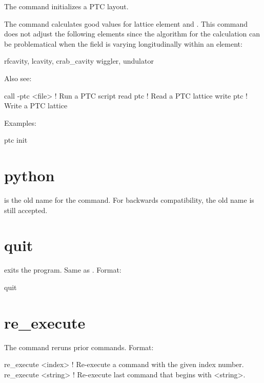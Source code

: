 \vskip 10pt 

The  command initializes a PTC layout.

The  command calculates good values for lattice element  and . This
command does not adjust the following elements since the algorithm for the calculation can be problematical when the field
is varying longitudinally within an element:
\begin{example}
  rfcavity, lcavity, crab_cavity
  wiggler, undulator
\end{example}

Also see:
\begin{example}
  call -ptc <file>         ! Run a PTC script
  read ptc                 ! Read a PTC lattice
  write ptc                ! Write a PTC lattice
\end{example}

Examples:
\begin{example}
  ptc init
\end{example}


\section{python}
\label{s:python}

 is the old name for the  command. For backwards compatibility,
the old name is still accepted.

\section{quit}
\label{s:quit}

 exits the program. Same as .
Format:
\begin{example}
  quit
\end{example}

\section{re_execute}
\label{s:re.exe}

The  command reruns prior commands.  Format:
\begin{example}
  re_execute <index>   ! Re-execute a command with the given index number.
  re_execute <string>  ! Re-execute last command that begins with <string>.
\end{example}

